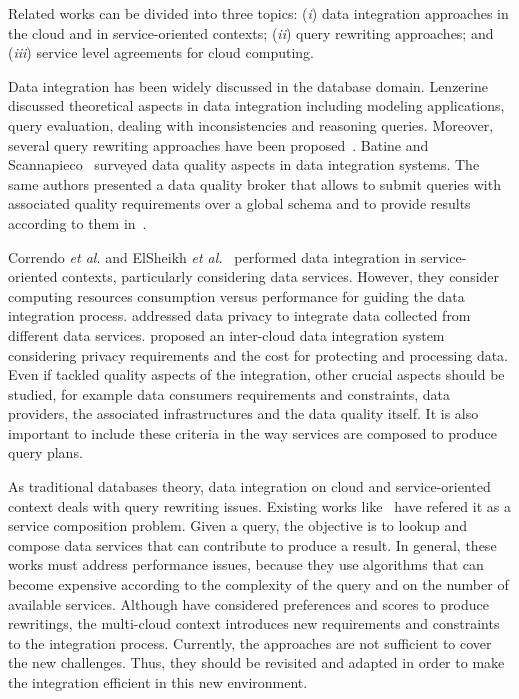 

Related works can be divided into three topics: (\textit{i}) data integration approaches in the cloud and in service-oriented contexts; (\textit{ii}) query rewriting approaches; and (\textit{iii}) service level agreements for cloud computing.

Data integration has been widely discussed in the database domain.
Lenzerine~\cite{Lenzerini:2002} discussed theoretical aspects in data integration including modeling applications, query evaluation, dealing with inconsistencies and reasoning queries.
Moreover, several query rewriting approaches have been proposed~\cite{Halevy:2001}. 
Batine and Scannapieco~\cite{Batini2006} surveyed data quality aspects in data integration systems. The same authors presented a data quality broker that allows to submit queries with associated quality requirements over a global schema and to provide results according to them in~\cite{Scannapieco:2004}.

Correndo \textit{et al.} and ElSheikh \textit{et al.}~\cite{Correndo2010,ElSheikh2013} performed data integration in service-oriented contexts, particularly considering data services. However, they  consider computing resources consumption versus performance for guiding the data integration process. \cite{YauY08} addressed data privacy  to integrate data collected from different data services. \cite{Tian2010} proposed an inter-cloud data integration system considering privacy requirements and the cost for protecting and processing data. Even if \cite{Scannapieco:2004,Tian2010,YauY08} tackled quality aspects of the integration,  other crucial aspects  should be studied, for example data consumers requirements and constraints, data providers, the associated infrastructures and the data quality itself. It is also important to include these criteria in the way services are composed to produce  query plans.

As traditional databases theory, data integration on cloud and service-oriented context deals with query rewriting issues. Existing works like~\cite{ba2014,Barhamgi2010,Benouaret2011,Umberto} have refered it as a service composition problem. Given a query, the objective is to lookup and compose data services that can contribute to produce a result. In general, these works must address performance issues, because they use algorithms that can become expensive according to the complexity of the query and on the number of available services. Although \cite{ba2014,Benouaret2011} have considered preferences and scores to produce rewritings, the multi-cloud context introduces new requirements and constraints to the integration process. Currently, the approaches are not sufficient to cover the new challenges. Thus, they should be revisited and adapted in order to make the integration efficient in this new environment. 

